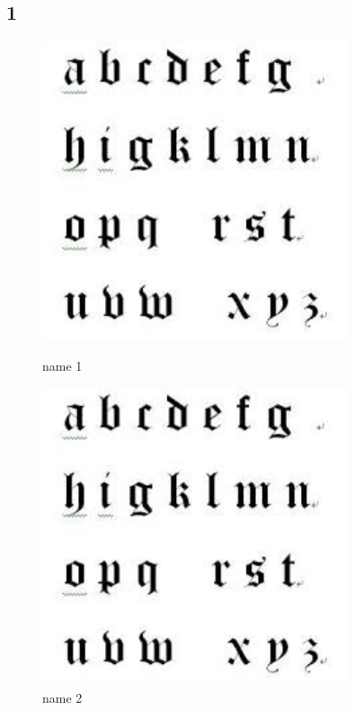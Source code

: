 \documentclass{article}
\begin{document}
\subsection{1}
\begin{figure}[H]
\centering %

\begin{minipage}[b]{0.45\textwidth} %
\centering %
\includegraphics[width=0.8\textwidth]{figures/abc.jpeg} %
\caption{name 1}
\label{Fig.1}
\end{minipage}
\begin{minipage}[b]{0.45\textwidth} %
\centering %
\includegraphics[width=0.8\textwidth]{figures/abc.jpeg}%
\caption{name 2}
\label{Fig.2}
\end{minipage}

\end{figure}
\end{document}
